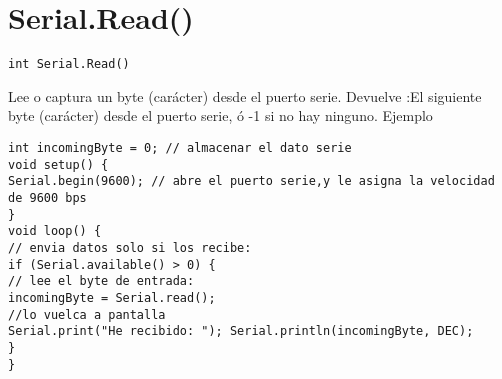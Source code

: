 \section{Serial.Read()}
\begin{lstlisting}
int Serial.Read()
\end{lstlisting}
Lee o captura un byte (carácter) desde el puerto serie. Devuelve :El siguiente byte (carácter) desde el puerto serie, ó -1 si no hay ninguno.
Ejemplo
\begin{lstlisting}
int incomingByte = 0; // almacenar el dato serie
void setup() {
Serial.begin(9600); // abre el puerto serie,y le asigna la velocidad de 9600 bps
}
void loop() {
// envia datos solo si los recibe:
if (Serial.available() > 0) {
// lee el byte de entrada:
incomingByte = Serial.read();
//lo vuelca a pantalla
Serial.print("He recibido: "); Serial.println(incomingByte, DEC);
}
}
\end{lstlisting}